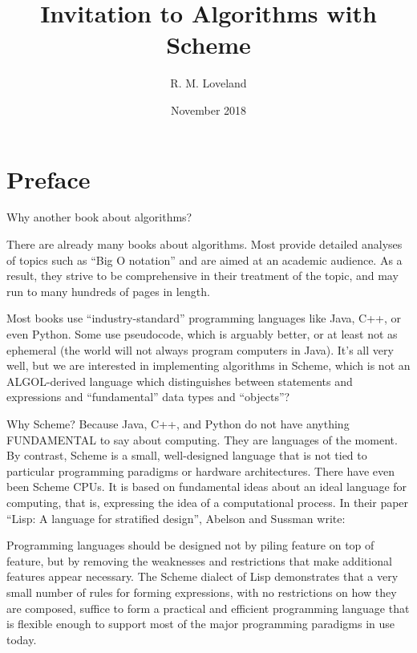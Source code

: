 \documentclass[12pt,openright,draft]{book}
\begin{document}
\title{Invitation to Algorithms with Scheme}
\author{R. M. Loveland}
\date{November 2018}

\frontmatter{}
\maketitle{}

\tableofcontents{}

\chapter{Preface}

Why another book about algorithms?

There are already many books about algorithms.  Most provide detailed
analyses of topics such as ``Big O notation'' and are aimed at an
academic audience.  As a result, they strive to be comprehensive in
their treatment of the topic, and may run to many hundreds of pages in
length.

Most books use ``industry-standard'' programming languages like Java,
C++, or even Python.  Some use pseudocode, which is arguably better,
or at least not as ephemeral (the world will not always program
computers in Java).  It's all very well, but we are interested in
implementing algorithms in Scheme, which is not an ALGOL-derived
language which distinguishes between statements and expressions and
``fundamental'' data types and ``objects''?

Why Scheme?  Because Java, C++, and Python do not have anything
FUNDAMENTAL to say about computing.  They are languages of the moment.
By contrast, Scheme is a small, well-designed language that is not
tied to particular programming paradigms or hardware architectures.
There have even been Scheme CPUs.  It is based on fundamental ideas
about an ideal language for computing, that is, expressing the idea of
a computational process.  In their paper ``Lisp: A language for
stratified design'', Abelson and Sussman write:

Programming languages should be designed not by piling feature on top
of feature, but by removing the weaknesses and restrictions that make
additional features appear necessary.  The Scheme dialect of Lisp
demonstrates that a very small number of rules for forming
expressions, with no restrictions on how they are composed, suffice to
form a practical and efficient programming language that is flexible
enough to support most of the major programming paradigms in use
today.
\end{document}
